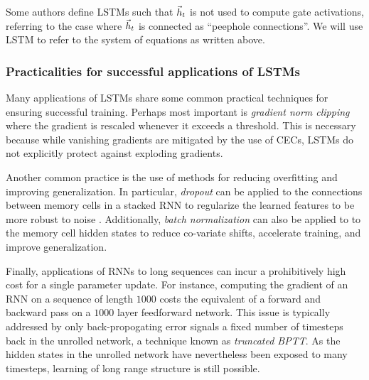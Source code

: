 \documentclass[dissertation.tex]{subfiles}
\begin{document}
Some authors define LSTMs such that $\vec{h}_t$ is not used to compute gate
activations, referring to the case where $\vec{h}_t$ is connected as ``peephole
connections''\cite{gers2000recurrent}. We will use LSTM to refer to the
system of equations as written above.

\subsubsection{Practicalities for successful applications of LSTMs}

Many applications of LSTMs  share some common practical
techniques for ensuring successful training. Perhaps most important is
\emph{gradient norm clipping} \cite{Mikolov2012}\cite{Pascanu2012} where the
gradient is rescaled whenever it exceeds a threshold. This is necessary because
while vanishing gradients are mitigated by the use of CECs, LSTMs do not
explicitly protect against exploding gradients.

Another common practice is the use of methods for reducing overfitting and
improving generalization. In particular, \emph{dropout}
\cite{srivastava2014dropout} can be applied to the connections between memory
cells in a stacked RNN to regularize the learned features to be more robust to
noise \cite{zaremba2014recurrent}. Additionally, \emph{batch
normalization}\cite{ioffe2015batch} can also be applied to to the memory cell
hidden states to reduce co-variate shifts, accelerate training, and improve
generalization.

Finally, applications of RNNs to long sequences can incur a prohibitively high
cost for a single parameter update\cite{citeulike:13881859}. For instance,
computing the gradient of an RNN on a sequence of length $1000$ costs the
equivalent of a forward and backward pass on a $1000$ layer feedforward
network. This issue is typically addressed by only back-propogating error
signals a fixed number of timesteps back in the unrolled network, a technique
known as \emph{truncated BPTT}\cite{williams1990efficient}. As the hidden
states in the unrolled network have nevertheless been exposed to many timesteps,
learning of long range structure is still possible.

\printbibliography
\end{document}
